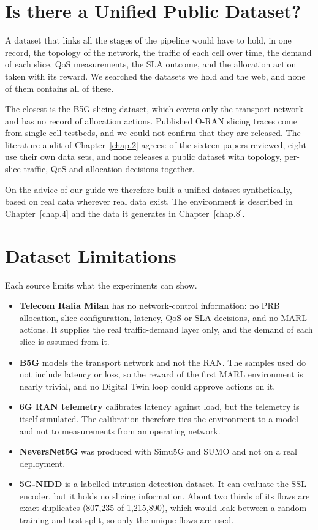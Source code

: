 \section{Is there a Unified Public Dataset?}
A dataset that links all the stages of the pipeline would have to hold, in one record, the topology of the network, the traffic of each cell over time, the demand of each slice, QoS measurements, the SLA outcome, and the allocation action taken with its reward. We searched the datasets we hold and the web, and none of them contains all of these.

The closest is the B5G slicing dataset, which covers only the transport network and has no record of allocation actions. Published O-RAN slicing traces come from single-cell testbeds, and we could not confirm that they are released. The literature audit of Chapter~\ref{chap.2} agrees: of the sixteen papers reviewed, eight use their own data sets, and none releases a public dataset with topology, per-slice traffic, QoS and allocation decisions together.

On the advice of our guide we therefore built a unified dataset synthetically, based on real data wherever real data exist. The environment is described in Chapter~\ref{chap.4} and the data it generates in Chapter~\ref{chap.8}.

\section{Dataset Limitations}
Each source limits what the experiments can show.
\begin{itemize}
	\item \textbf{Telecom Italia Milan} has no network-control information: no PRB allocation, slice configuration, latency, QoS or SLA decisions, and no MARL actions. It supplies the real traffic-demand layer only, and the demand of each slice is assumed from it.
	\item \textbf{B5G} models the transport network and not the RAN. The samples used do not include latency or loss, so the reward of the first MARL environment is nearly trivial, and no Digital Twin loop could approve actions on it.
	\item \textbf{6G RAN telemetry} calibrates latency against load, but the telemetry is itself simulated. The calibration therefore ties the environment to a model and not to measurements from an operating network.
	\item \textbf{NeversNet5G} was produced with Simu5G and SUMO and not on a real deployment.
	\item \textbf{5G-NIDD} is a labelled intrusion-detection dataset. It can evaluate the SSL encoder, but it holds no slicing information. About two thirds of its flows are exact duplicates (807{,}235 of 1{,}215{,}890), which would leak between a random training and test split, so only the unique flows are used.
\end{itemize}
